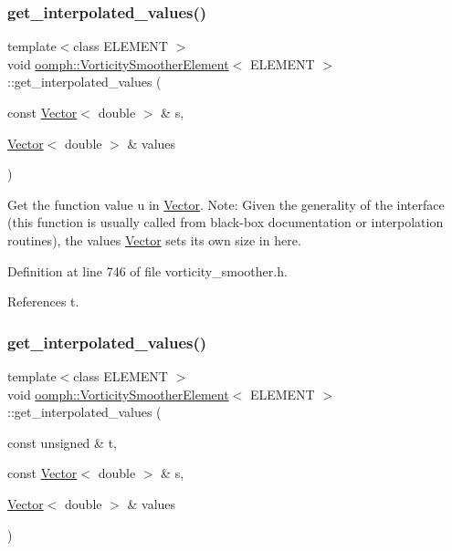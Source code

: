 \subsubsection{\texorpdfstring{get\+\_\+interpolated\+\_\+values()}{get\_interpolated\_values()}\hspace{0.1cm}{\footnotesize\ttfamily [1/2]}}
{\footnotesize\ttfamily template$<$class E\+L\+E\+M\+E\+NT $>$ \\
void \hyperlink{classoomph_1_1VorticitySmootherElement}{oomph\+::\+Vorticity\+Smoother\+Element}$<$ E\+L\+E\+M\+E\+NT $>$\+::get\+\_\+interpolated\+\_\+values (\begin{DoxyParamCaption}\item[{const \hyperlink{classoomph_1_1Vector}{Vector}$<$ double $>$ \&}]{s,  }\item[{\hyperlink{classoomph_1_1Vector}{Vector}$<$ double $>$ \&}]{values }\end{DoxyParamCaption})\hspace{0.3cm}{\ttfamily [inline]}}



Get the function value u in \hyperlink{classoomph_1_1Vector}{Vector}. Note\+: Given the generality of the interface (this function is usually called from black-\/box documentation or interpolation routines), the values \hyperlink{classoomph_1_1Vector}{Vector} sets its own size in here. 



Definition at line 746 of file vorticity\+\_\+smoother.\+h.



References t.

\mbox{\label{classoomph_1_1VorticitySmootherElement_ab1ee981ddf465edc8a55bf281ce073c7}} 
\subsubsection{\texorpdfstring{get\+\_\+interpolated\+\_\+values()}{get\_interpolated\_values()}\hspace{0.1cm}{\footnotesize\ttfamily [2/2]}}
{\footnotesize\ttfamily template$<$class E\+L\+E\+M\+E\+NT $>$ \\
void \hyperlink{classoomph_1_1VorticitySmootherElement}{oomph\+::\+Vorticity\+Smoother\+Element}$<$ E\+L\+E\+M\+E\+NT $>$\+::get\+\_\+interpolated\+\_\+values (\begin{DoxyParamCaption}\item[{const unsigned \&}]{t,  }\item[{const \hyperlink{classoomph_1_1Vector}{Vector}$<$ double $>$ \&}]{s,  }\item[{\hyperlink{classoomph_1_1Vector}{Vector}$<$ double $>$ \&}]{values }\end{DoxyParamCaption})\hspace{0.3cm}{\ttfamily [inline]}}



